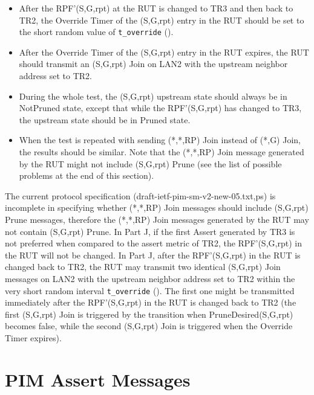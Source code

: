 \documentclass[11pt]{report}
\begin{document}
\begin{itemize}
  \item After the RPF'(S,G,rpt) at the RUT is changed to TR3 and then back to
  TR2, the Override Timer of the (S,G,rpt) entry in the RUT should be set to
  the short random value of \verb=t_override= ({\PimsmTOverride}).

  \item After the Override Timer of the (S,G,rpt) entry in the RUT expires,
  the RUT should transmit an (S,G,rpt) Join on LAN2 with the upstream neighbor
  address set to TR2.

  \item During the whole test, the (S,G,rpt) upstream state should always be
  in NotPruned state, except that while the RPF'(S,G,rpt) has changed to TR3,
  the upstream state should be in Pruned state.

  \item When the test is repeated with sending (*,*,RP) Join instead of (*,G)
  Join, the results should be similar.
  Note that the (*,*,RP) Join message generated by the RUT might not include
  (S,G,rpt) Prune (see the list of possible problems at the end of this
  section).

\end{itemize}

The current protocol specification (draft-ietf-pim-sm-v2-new-05.{txt,ps}) is
incomplete in 
specifying whether (*,*,RP) Join messages should include (S,G,rpt) Prune
messages, therefore the (*,*,RP) Join messages generated by the RUT may not
contain (S,G,rpt) Prune.
In Part J, if the first Assert generated by TR3 is not preferred when compared
to the assert metric of TR2, the RPF'(S,G,rpt) in the RUT will not be changed.
In Part J, after the RPF'(S,G,rpt) in the RUT is changed back to TR2, the RUT
may transmit two identical (S,G,rpt) Join messages on LAN2 with the upstream
neighbor address set to TR2 within the very short random interval
\verb=t_override= ({\PimsmTOverride}). The first one might be transmitted
immediately after the RPF'(S,G,rpt) in the RUT is changed back to TR2 (the
first (S,G,rpt) Join is triggered by the transition when PruneDesired(S,G,rpt)
becomes false, while the second (S,G,rpt) Join is triggered when the Override
Timer expires).



\chapter{PIM Assert Messages}
\end{document}
